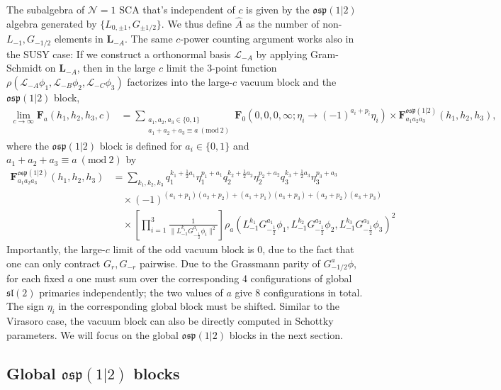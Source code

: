 \documentclass[12pt]{article}
\newcommand{\ie}{\begin{equation}\begin{aligned}}
\newcommand{\fe}{\end{aligned}\end{equation}}
\numberwithin{equation}{section}
\begin{document}
The subalgebra of $\mathcal{N}=1$ SCA that's independent of $c$ is given by the $\mathfrak{osp}(1|2)$ algebra generated by $\{L_{0,\pm 1}, G_{\pm 1/2}\}$. We thus define $\hat{A}$ as the number of non-$L_{-1}, G_{-1/2}$ elements in $\mathbf{L}_{-A}$. The same $c$-power counting argument works also in the SUSY case: If we construct a orthonormal basis $\mathcal{L}_{-A}$ by applying Gram-Schmidt on $\mathbf{L}_{-A}$, then in the large $c$ limit the 3-point function $\rho(\mathcal{L}_{-A}\phi_1,\mathcal{L}_{-B}\phi_2, \mathcal{L}_{-C}\phi_3)$ factorizes into the large-$c$ vacuum block and the $\mathfrak{osp}(1|2)$ block,
\ie
\lim_{c\rightarrow \infty}\mathbf{F}_a(h_1, h_2, h_3,c) &= \sum_{\substack{a_1,a_2,a_3\in\{0,1\}\\a_1+a_2+a_3\equiv a\ (\mathrm{mod}\ 2)}} \mathbf{F}_0(0,0,0,\infty;\eta_i\rightarrow (-1)^{a_i+p_i}\eta_i) \times \mathbf{F}_{a_1a_2a_3}^{\mathfrak{osp}(1|2)}(h_1,h_2,h_3),
\fe
where the $\mathfrak{osp}(1|2)$ block is defined for $a_i\in\{0,1\}$ and $a_1+a_2+a_3\equiv a\ (\mathrm{mod}\ 2)$ by
\ie
\mathbf{F}^{\mathfrak{osp}(1|2)}_{a_1a_2a_3}(h_1, h_2, h_3) &= \sum_{k_1, k_2, k_3} q_1^{k_1+\frac{1}{2}a_1}\eta_1^{p_1+a_1}q_2^{k_2+\frac{1}{2}a_2}\eta_2^{p_2+a_2}q_3^{k_3+\frac{1}{2}a_3}\eta_3^{p_3+a_3} \\&\quad \times (-1)^{(a_1+p_1)(a_2+p_2)+(a_1+p_1)(a_3+p_3)+(a_2+p_2)(a_3+p_3)}\\
&\quad \times \left[\prod_{i=1}^3 \frac{1}{\|L_{-1}^{k_i}G_{-\frac{1}{2}}^{a_i}\phi_i\|^2}\right] \rho_a(L_{-1}^{k_1}G_{-\frac{1}{2}}^{a_1}\phi_1,L_{-1}^{k_2}G_{-\frac{1}{2}}^{a_2}\phi_2,L_{-1}^{k_3}G_{-\frac{1}{2}}^{a_3}\phi_3)^2
\fe
Importantly, the large-$c$ limit of the odd vacuum block is 0, due to the fact that one can only contract $G_r,G_{-r}$ pairwise. Due to the Grassmann parity of $G_{-1/2}^{a}\phi$, for each fixed $a$ one must sum over the corresponding 4 configurations of global $\mathfrak{sl}(2)$ primaries independently; the two values of $a$ give 8 configurations in total. The sign $\eta_i$ in the corresponding global block must be shifted. Similar to the Virasoro case, the vacuum block can also be directly computed in Schottky parameters. We will focus on the global $\mathfrak{osp}(1|2)$ blocks in the next section.



\subsection{Global $\mathfrak{osp}(1|2)$ blocks}
\end{document}
